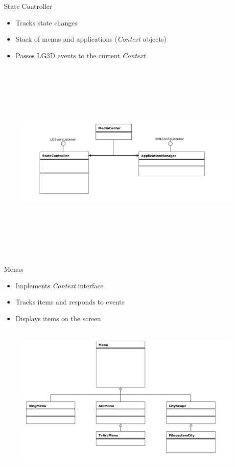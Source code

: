 \documentclass[style=smrt,mode=present,paper=screen]{powerdot}
\begin{document}
\begin{slide}{State Controller}
\begin{itemize}
	\item Tracks state changes
	\item Stack of menus and applications (\emph{Context} objects)
	\item Passes LG3D events to the current \emph{Context}
\end{itemize}
\begin{figure}
\includegraphics[height=4in,angle=-90]{../lib/figures/MediaCenter-uml}
\end{figure}
\end{slide}

\begin{slide}{Menus}
\begin{itemize}
	\item Implements \emph{Context} interface
	\item Tracks items and responds to events
	\item Displays items on the screen
\end{itemize}
\begin{figure}[htb]
\includegraphics[height=3in,angle=-90]{../lib/figures/Menu-uml}
\end{figure}
\end{slide}
\end{document}
